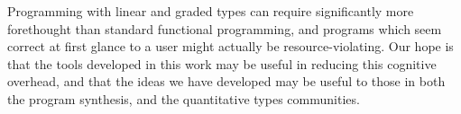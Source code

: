 Programming with linear and graded types can require significantly more
forethought than standard functional programming, and programs which seem
correct at first glance to a user might actually be resource-violating. Our hope
is that the tools developed in this work may be useful in reducing this
cognitive overhead, and that the ideas we have developed may be useful to those
in both the program synthesis, and the quantitative types communities.